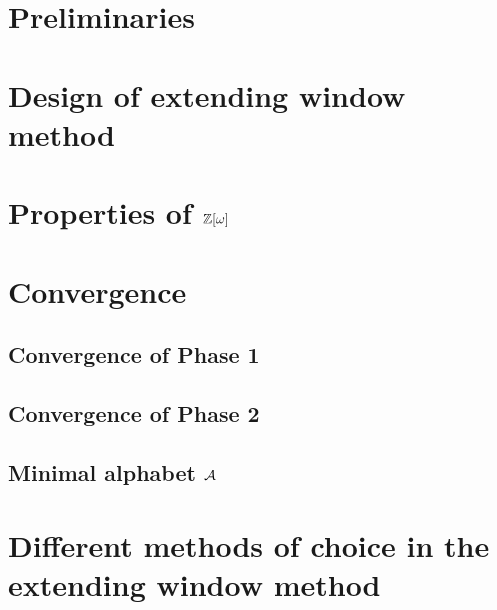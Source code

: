 \documentclass[11pt,a4paper]{report}	%
\theoremstyle{definition}
\begin{document}
\tableofcontents



\chapter{Preliminaries}
	



\chapter{Design of extending window method}
	

\chapter{\texorpdfstring{Properties of $\mathbb{Z}[\omega]$}{Properties of Z[omega]}}
	
	
		
	
\chapter{Convergence}
\label{chap:convergence}

	\section{Convergence of Phase 1}
	

	\section{Convergence of Phase 2}
	
	
	\section{Minimal alphabet $\mathcal{A}$}
	


\chapter{Different methods of choice in the extending window method}
\end{document}
